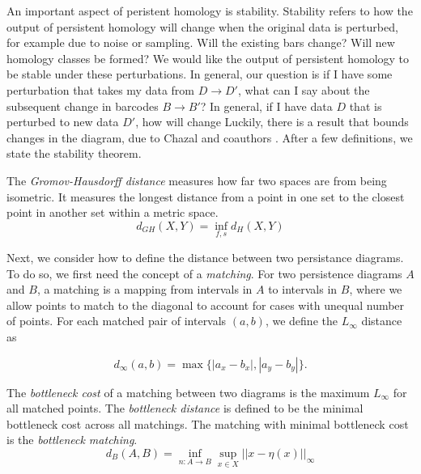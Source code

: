 An important aspect of peristent homology is stability.
Stability refers to how the output of persistent homology will change when the original data is perturbed, for example due to noise or sampling.
Will the existing bars change?
Will new homology classes be formed?
We would like the output of persistent homology to be stable under these perturbations.
In general, our question is if I have some perturbation that takes my data from $D\rightarrow D'$, what can I say about the subsequent change in barcodes $B\rightarrow B'$?
In general, if I have data $D$ that is perturbed to new data $D'$, how will change
Luckily, there is a result that bounds changes in the diagram, due to Chazal and coauthors \citep{Chazal:2009wc}.
After a few definitions, we state the stability theorem.

\begin{defn}
\label{defn:gromovhausdorff}
The \emph{Gromov-Hausdorff distance} measures how far two spaces are from being isometric.
It measures the longest distance from a point in one set to the closest point in another set within a metric space.
\begin{equation}
d_{GH}(X,Y)=\inf_{f,s} d_H(X,Y)
\end{equation}
\end{defn}

Next, we consider how to define the distance between two persistance diagrams.
To do so, we first need the concept of a \emph{matching}.
For two persistence diagrams $A$ and $B$, a matching is a mapping from intervals in $A$ to intervals in $B$, where we allow points to match to the diagonal to account for cases with unequal number of points.
For each matched pair of intervals $(a,b)$, we define the $L_{\infty}$ distance as

\begin{equation}
d_{\infty}(a,b) = \max\{ |a_{x}-b_{x}|, |a_{y}-b_{y}| \}.
\end{equation}

\begin{defn}
\label{defn:bottleneck}
The \emph{bottleneck cost} of a matching between two diagrams is the maximum $L_{\infty}$ for all matched points. The \emph{bottleneck distance} is defined to be the minimal bottleneck cost across all matchings. The matching with minimal bottleneck cost is the \emph{bottleneck matching}.
\begin{equation}
d_{B}(A,B) = \inf_{n:A\rightarrow B} \sup_{x\in X} ||x-\eta(x)||_{\infty}
\end{equation}
\end{defn}

